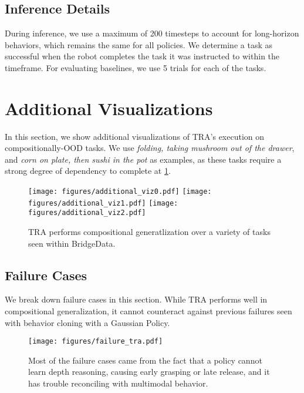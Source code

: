 \subsection{Inference Details}

During inference, we use a maximum of 200 timesteps to account for long-horizon behaviors, which remains the same for all policies.
We determine a task as successful when the robot completes the task it was instructed to within the timeframe.
For evaluating baselines, we use 5 trials for each of the tasks.

\section{Additional Visualizations} \label{sec:additional_viz}

In this section, we show additional visualizations of TRA's execution on compositionally-OOD tasks.
We use \textit{folding, taking mushroom out of the drawer}, and \textit{corn on plate, then sushi in the pot} as examples, as these tasks require a strong degree of dependency to complete at \cref{fig:additional_viz}.

\begin{figure}[htb]\label{fig:additional_viz}
    \centering
    \vbox{
        \hbox{\texttt{[image: figures/additional\_viz0.pdf]}}
        \vspace*{3ex}
        \hbox{\texttt{[image: figures/additional\_viz1.pdf]}}
        \vspace*{3ex}
        \hbox{\texttt{[image: figures/additional\_viz2.pdf]}}
        \vspace*{1ex}
    }
    \caption{TRA performs compositional generatlization over a variety of tasks seen within BridgeData.}
\end{figure}

\subsection{Failure Cases} \label{sec:failure_cases}
We break down failure cases in this section.
While TRA performs well in compositional generalization, it cannot counteract against previous failures seen with behavior cloning with a Gaussian Policy.

\begin{figure}[htb]
    \centering
    \texttt{[image: figures/failure\_tra.pdf]}
    \vspace*{1ex}
    \caption{Most of the failure cases came from the fact that a policy cannot learn depth reasoning, causing early grasping or late release, and it has trouble reconciling with multimodal behavior.}
    \label{fig:failure_tra}
\end{figure}

